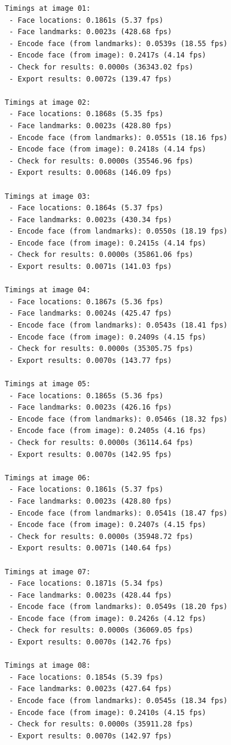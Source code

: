 \begin{lstlisting}[language=tex, caption=Orientáció teszt eredménye.,label=lst:ori_mel]
Timings at image 01:
 - Face locations: 0.1861s (5.37 fps)
 - Face landmarks: 0.0023s (428.68 fps)
 - Encode face (from landmarks): 0.0539s (18.55 fps)
 - Encode face (from image): 0.2417s (4.14 fps)
 - Check for results: 0.0000s (36343.02 fps)
 - Export results: 0.0072s (139.47 fps)

Timings at image 02:
 - Face locations: 0.1868s (5.35 fps)
 - Face landmarks: 0.0023s (428.80 fps)
 - Encode face (from landmarks): 0.0551s (18.16 fps)
 - Encode face (from image): 0.2418s (4.14 fps)
 - Check for results: 0.0000s (35546.96 fps)
 - Export results: 0.0068s (146.09 fps)

Timings at image 03:
 - Face locations: 0.1864s (5.37 fps)
 - Face landmarks: 0.0023s (430.34 fps)
 - Encode face (from landmarks): 0.0550s (18.19 fps)
 - Encode face (from image): 0.2415s (4.14 fps)
 - Check for results: 0.0000s (35861.06 fps)
 - Export results: 0.0071s (141.03 fps)

Timings at image 04:
 - Face locations: 0.1867s (5.36 fps)
 - Face landmarks: 0.0024s (425.47 fps)
 - Encode face (from landmarks): 0.0543s (18.41 fps)
 - Encode face (from image): 0.2409s (4.15 fps)
 - Check for results: 0.0000s (35305.75 fps)
 - Export results: 0.0070s (143.77 fps)

Timings at image 05:
 - Face locations: 0.1865s (5.36 fps)
 - Face landmarks: 0.0023s (426.16 fps)
 - Encode face (from landmarks): 0.0546s (18.32 fps)
 - Encode face (from image): 0.2405s (4.16 fps)
 - Check for results: 0.0000s (36114.64 fps)
 - Export results: 0.0070s (142.95 fps)

Timings at image 06:
 - Face locations: 0.1861s (5.37 fps)
 - Face landmarks: 0.0023s (428.80 fps)
 - Encode face (from landmarks): 0.0541s (18.47 fps)
 - Encode face (from image): 0.2407s (4.15 fps)
 - Check for results: 0.0000s (35948.72 fps)
 - Export results: 0.0071s (140.64 fps)

Timings at image 07:
 - Face locations: 0.1871s (5.34 fps)
 - Face landmarks: 0.0023s (428.44 fps)
 - Encode face (from landmarks): 0.0549s (18.20 fps)
 - Encode face (from image): 0.2426s (4.12 fps)
 - Check for results: 0.0000s (36069.05 fps)
 - Export results: 0.0070s (142.76 fps)

Timings at image 08:
 - Face locations: 0.1854s (5.39 fps)
 - Face landmarks: 0.0023s (427.64 fps)
 - Encode face (from landmarks): 0.0545s (18.34 fps)
 - Encode face (from image): 0.2410s (4.15 fps)
 - Check for results: 0.0000s (35911.28 fps)
 - Export results: 0.0070s (142.97 fps)


\end{lstlisting}

